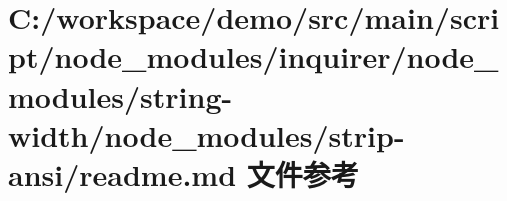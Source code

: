 \hypertarget{node__modules_2inquirer_2node__modules_2string-width_2node__modules_2strip-ansi_2_r_e_a_d_m_e_8md}{}\section{C\+:/workspace/demo/src/main/script/node\+\_\+modules/inquirer/node\+\_\+modules/string-\/width/node\+\_\+modules/strip-\/ansi/readme.md 文件参考}
\label{node__modules_2inquirer_2node__modules_2string-width_2node__modules_2strip-ansi_2_r_e_a_d_m_e_8md}
